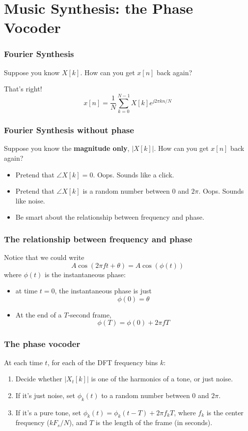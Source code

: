 \documentclass{beamer}
\begin{document}
\section[Phase Vocoder]{Music Synthesis: the Phase Vocoder}
\setcounter{subsection}{1}

\begin{frame}
  \frametitle{Fourier Synthesis}

  Suppose you know $X[k]$.  How can you get $x[n]$ back again?

  That's right!
  \[
  x[n] = \frac{1}{N}\sum_{k=0}^{N-1} X[k] e^{j2\pi kn/N}
  \]
\end{frame}

\begin{frame}
  \frametitle{Fourier Synthesis without phase}

  Suppose you know the {\bf magnitude only}, $|X[k]|$.  How can you
  get $x[n]$ back again?
  \begin{itemize}
  \item Pretend that $\angle X[k]=0$.  Oops.  Sounds like a click.
  \item Pretend that $\angle X[k]$ is a random number between $0$ and
    $2\pi$.  Oops.  Sounds like noise.
  \item Be smart about the relationship between frequency and phase.
  \end{itemize}
\end{frame}

\begin{frame}
  \frametitle{The relationship between frequency and phase}

  Notice that we could write
  \[
  A\cos\left(2\pi ft+\theta\right)=A\cos(\phi(t))
  \]
  where $\phi(t)$ is the instantaneous phase:
  \begin{itemize}
  \item at time $t=0$, the instantaneous phase is just
    \[
    \phi(0) = \theta
    \]
  \item At the end of a $T$-second frame,
    \[
    \phi(T) = \phi(0)+2\pi fT
    \]
  \end{itemize}
\end{frame}

\begin{frame}
  \frametitle{The phase vocoder}

  At  each time $t$, for each of the DFT frequency bins $k$:
  \begin{enumerate}
  \item Decide whether $|X_t[k]|$ is one of the harmonics of a tone, or just noise.
  \item If it's just noise, set $\phi_k(t)$ to a random number between $0$ and $2\pi$.
  \item If it's a pure tone, set $\phi_k(t)=\phi_k(t-T)+2\pi f_k T$,
    where $f_k$ is the center frequency ($kF_s/N$), and $T$ is the
    length of the frame (in seconds).
  \end{enumerate}
\end{frame}
\end{document}
